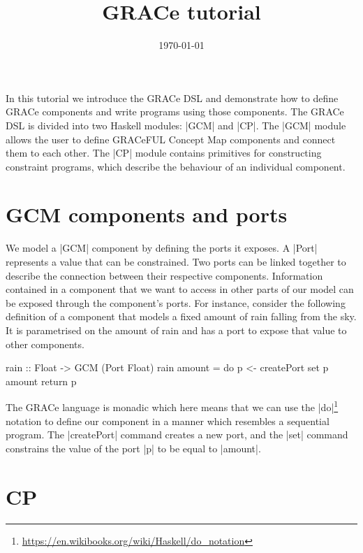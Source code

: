 \documentclass[a4paper]{article}
\title{GRACe tutorial}
\author{}
\date{\today}
\begin{document}
\maketitle


\noindent
In this tutorial we introduce the GRACe DSL and demonstrate how to define GRACe
components and write programs using those components. The GRACe DSL is divided
into two Haskell modules: |GCM| and |CP|. The |GCM| module allows the user to
define GRACeFUL Concept Map components and connect them to each other. The |CP|
module contains primitives for constructing constraint programs, which describe
the behaviour of an individual component.


\section{GCM components and ports}

We model a |GCM| component by defining the ports it exposes. A |Port| represents
a value that can be constrained. Two ports can be linked together to describe
the connection between their respective components. Information contained in a
component that we want to access in other parts of our model can be exposed
through the component's ports. For instance, consider the following definition
of a component that models a fixed amount of rain falling from the sky.  It is
parametrised on the amount of rain and has a port to expose that value to other
components.
\begin{haskellcode}
rain :: Float -> GCM (Port Float)
rain amount = do
  p <- createPort
  set p amount
  return p
\end{haskellcode}
The GRACe language is monadic which here means that we can use the
|do|\footnote{\url{https://en.wikibooks.org/wiki/Haskell/do_notation}}
notation to define our component in a manner which resembles a
sequential program. The |createPort| command creates a new port, and
the |set| command constrains the value of the port |p| to be equal to
|amount|.


\section{CP}
\end{document}
